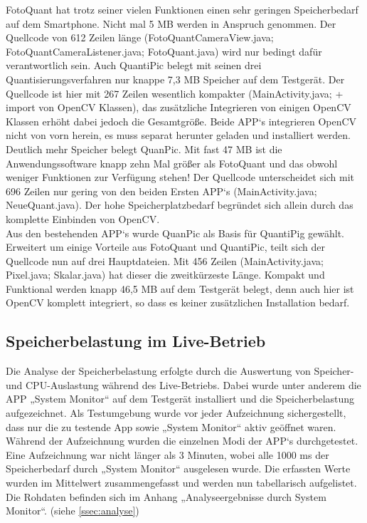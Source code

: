 FotoQuant hat trotz seiner vielen Funktionen einen sehr geringen Speicherbedarf auf dem Smartphone. Nicht mal 5 MB werden in Anspruch genommen. Der Quellcode von 612 Zeilen länge (FotoQuantCameraView.java; FotoQuantCameraListener.java; FotoQuant.java) wird nur bedingt dafür verantwortlich sein. Auch QuantiPic belegt mit seinen drei Quantisierungsverfahren nur knappe 7,3 MB Speicher auf dem Testgerät. Der Quellcode ist hier mit 267 Zeilen wesentlich kompakter (MainActivity.java; + import von OpenCV Klassen), das zusätzliche Integrieren von einigen OpenCV Klassen erhöht dabei jedoch die Gesamtgröße. Beide APP‘s integrieren OpenCV nicht von vorn herein, es muss separat herunter geladen und installiert werden.
\\
Deutlich mehr Speicher belegt QuanPic. Mit fast 47 MB ist die Anwendungssoftware knapp zehn Mal größer als FotoQuant und das obwohl weniger Funktionen zur Verfügung stehen! Der Quellcode unterscheidet sich mit 696 Zeilen nur gering von den beiden Ersten APP‘s (MainActivity.java; NeueQuant.java). Der hohe Speicherplatzbedarf begründet sich allein durch das komplette Einbinden von OpenCV. 
\\
Aus den bestehenden APP‘s wurde QuanPic als Basis für QuantiPig gewählt. Erweitert um einige Vorteile aus FotoQuant und QuantiPic, teilt sich der Quellcode nun auf drei Hauptdateien. Mit 456 Zeilen (MainActivity.java; Pixel.java; Skalar.java) hat dieser die zweitkürzeste Länge. Kompakt und Funktional werden knapp 46,5 MB auf dem Testgerät belegt, denn auch hier ist OpenCV komplett integriert, so dass es keiner zusätzlichen Installation bedarf.

\subsection{\textbf{Speicherbelastung im Live-Betrieb}}

Die Analyse der Speicherbelastung erfolgte durch die Auswertung von Speicher- und CPU-Auslastung während des Live-Betriebs. Dabei wurde unter anderem die APP „System Monitor“ auf dem Testgerät installiert und die Speicherbelastung aufgezeichnet. Als Testumgebung wurde vor jeder Aufzeichnung sichergestellt, dass nur die zu testende App sowie „System Monitor“ aktiv geöffnet waren. Während der Aufzeichnung wurden die einzelnen Modi der APP‘s durchgetestet. Eine Aufzeichnung war nicht länger als 3 Minuten, wobei alle 1000 ms der Speicherbedarf durch „System Monitor“ ausgelesen wurde. Die erfassten Werte wurden im Mittelwert zusammengefasst und werden nun tabellarisch aufgelistet. Die Rohdaten befinden sich im Anhang „Analyseergebnisse durch System Monitor“.  (siehe \ref{ssec:analyse})

